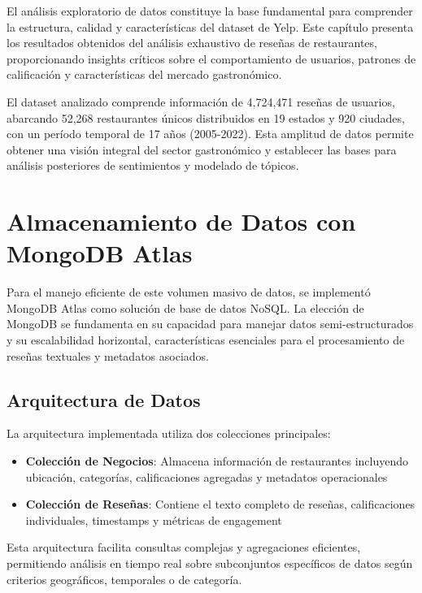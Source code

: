\documentclass[12pt,a4paper,twoside,openany]{book}
\begin{document}
El análisis exploratorio de datos constituye la base fundamental para comprender la estructura, calidad y características del dataset de Yelp. Este capítulo presenta los resultados obtenidos del análisis exhaustivo de reseñas de restaurantes, proporcionando insights críticos sobre el comportamiento de usuarios, patrones de calificación y características del mercado gastronómico.

El dataset analizado comprende información de 4,724,471 reseñas de usuarios, abarcando 52,268 restaurantes únicos distribuidos en 19 estados y 920 ciudades, con un período temporal de 17 años (2005-2022). Esta amplitud de datos permite obtener una visión integral del sector gastronómico y establecer las bases para análisis posteriores de sentimientos y modelado de tópicos.

\section{Almacenamiento de Datos con MongoDB Atlas}

Para el manejo eficiente de este volumen masivo de datos, se implementó MongoDB Atlas como solución de base de datos NoSQL. La elección de MongoDB se fundamenta en su capacidad para manejar datos semi-estructurados y su escalabilidad horizontal, características esenciales para el procesamiento de reseñas textuales y metadatos asociados.

\subsection{Arquitectura de Datos}

La arquitectura implementada utiliza dos colecciones principales:

\begin{itemize}
    \item \textbf{Colección de Negocios}: Almacena información de restaurantes incluyendo ubicación, categorías, calificaciones agregadas y metadatos operacionales
    \item \textbf{Colección de Reseñas}: Contiene el texto completo de reseñas, calificaciones individuales, timestamps y métricas de engagement
\end{itemize}

Esta arquitectura facilita consultas complejas y agregaciones eficientes, permitiendo análisis en tiempo real sobre subconjuntos específicos de datos según criterios geográficos, temporales o de categoría.
\end{document}
